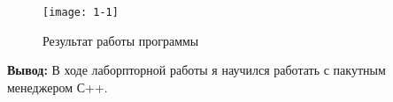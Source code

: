 \begin{figure}[h]%
\centering
\texttt{[image: 1-1]}
\caption{Результат работы программы}
\label{fig:1-1}
\end{figure}




\newpage
\textbf{Вывод:}
В ходе лаборпторной работы я научился работать с пакутным менеджером С++.




